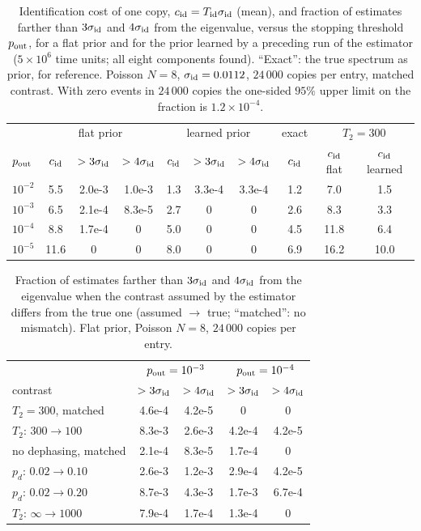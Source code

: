 \documentclass[journal]{IEEEtran}
\begin{document}
\begin{table}[t]
\caption{Identification cost of one copy, $c_{\rm id}=T_{\rm id}\sigma_{\rm id}$ (mean), and fraction of estimates farther than $3\sigma_{\rm id}$ and $4\sigma_{\rm id}$ from the eigenvalue, versus the stopping threshold $p_{\rm out}$, for a flat prior and for the prior learned by a preceding run of the estimator ($5\times10^6$ time units; all eight components found). ``Exact'': the true spectrum as prior, for reference. Poisson $N=8$, $\sigma_{\rm id}=0.0112$, $24\,000$ copies per entry, matched contrast. With zero events in $24\,000$ copies the one-sided $95\%$ upper limit on the fraction is $1.2\times10^{-4}$.}
\label{tab:cost}
\centering\footnotesize
\begin{tabular}{lccccccccc}
\toprule
 & \multicolumn{3}{c}{flat prior} & \multicolumn{3}{c}{learned prior} & exact & \multicolumn{2}{c}{$T_2=300$}\\
$p_{\rm out}$ & $c_{\rm id}$ & $>3\sigma_{\rm id}$ & $>4\sigma_{\rm id}$ & $c_{\rm id}$ & $>3\sigma_{\rm id}$ & $>4\sigma_{\rm id}$ & $c_{\rm id}$ & $c_{\rm id}$ flat & $c_{\rm id}$ learned\\
\midrule
$10^{-2}$ & 5.5 & 2.0e-3 & 1.0e-3 & 1.3 & 3.3e-4 & 3.3e-4 & 1.2 & 7.0 & 1.5\\
$10^{-3}$ & 6.5 & 2.1e-4 & 8.3e-5 & 2.7 & 0 & 0 & 2.6 & 8.3 & 3.3\\
$10^{-4}$ & 8.8 & 1.7e-4 & 0 & 5.0 & 0 & 0 & 4.5 & 11.8 & 6.4\\
$10^{-5}$ & 11.6 & 0 & 0 & 8.0 & 0 & 0 & 6.9 & 16.2 & 10.0\\
\bottomrule
\end{tabular}
\end{table}

\begin{table}[t]
\caption{Fraction of estimates farther than $3\sigma_{\rm id}$ and $4\sigma_{\rm id}$ from the eigenvalue when the contrast assumed by the estimator differs from the true one (assumed $\to$ true; ``matched'': no mismatch). Flat prior, Poisson $N=8$, $24\,000$ copies per entry.}
\label{tab:miscal}
\centering\footnotesize
\begin{tabular}{lcccc}
\toprule
 & \multicolumn{2}{c}{$p_{\rm out}=10^{-3}$} & \multicolumn{2}{c}{$p_{\rm out}=10^{-4}$}\\
contrast & $>3\sigma_{\rm id}$ & $>4\sigma_{\rm id}$ & $>3\sigma_{\rm id}$ & $>4\sigma_{\rm id}$\\
\midrule
$T_2=300$, matched & 4.6e-4 & 4.2e-5 & 0 & 0\\
$T_2$: $300\to100$ & 8.3e-3 & 2.6e-3 & 4.2e-4 & 4.2e-5\\
no dephasing, matched & 2.1e-4 & 8.3e-5 & 1.7e-4 & 0\\
$p_d$: $0.02\to0.10$ & 2.6e-3 & 1.2e-3 & 2.9e-4 & 4.2e-5\\
$p_d$: $0.02\to0.20$ & 8.7e-3 & 4.3e-3 & 1.7e-3 & 6.7e-4\\
$T_2$: $\infty\to1000$ & 7.9e-4 & 1.7e-4 & 1.3e-4 & 0\\
\bottomrule
\end{tabular}
\end{table}
\end{document}
